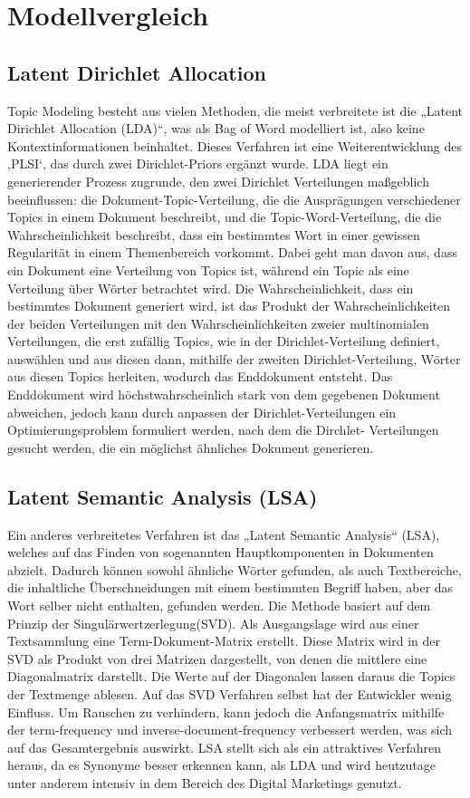 \documentclass[german,version-2020-11]{uzl-thesis}
\begin{document}
\section{Modellvergleich}
\subsection{Latent Dirichlet Allocation}
Topic Modeling besteht aus vielen Methoden, die meist verbreitete ist die „Latent Dirichlet Allocation (LDA)“, was als Bag of Word modelliert ist, also keine Kontextinformationen beinhaltet. Dieses Verfahren ist eine Weiterentwicklung des ‚PLSI‘, das durch zwei Dirichlet-Priors ergänzt wurde. LDA liegt ein generierender Prozess zugrunde, den zwei Dirichlet Verteilungen maßgeblich beeinflussen: die Dokument-Topic-Verteilung, die die Ausprägungen verschiedener Topics in einem Dokument beschreibt, und die Topic-Word-Verteilung, die die Wahrscheinlichkeit beschreibt, dass ein bestimmtes Wort in einer gewissen Regularität in einem Themenbereich vorkommt. Dabei geht man davon aus, dass ein Dokument eine Verteilung von Topics ist, während ein Topic als eine Verteilung über Wörter betrachtet wird. 
Die Wahrscheinlichkeit, dass ein bestimmtes Dokument generiert wird, ist das Produkt der Wahrscheinlichkeiten der beiden Verteilungen mit den Wahrscheinlichkeiten zweier multinomialen Verteilungen, die erst zufällig Topics, wie in der Dirichlet-Verteilung definiert, auswählen und aus diesen dann, mithilfe der zweiten Dirichlet-Verteilung, Wörter aus diesen Topics herleiten, wodurch das Enddokument entsteht. Das Enddokument wird höchstwahrscheinlich stark von dem gegebenen Dokument abweichen, jedoch kann durch anpassen der Dirichlet-Verteilungen ein Optimierungsproblem formuliert werden, nach dem die Dirchlet- Verteilungen gesucht werden, die ein möglichst ähnliches Dokument generieren.

\subsection{Latent Semantic Analysis (LSA)}
Ein anderes verbreitetes Verfahren ist das „Latent Semantic Analysis“ (LSA), welches auf das Finden von sogenannten Hauptkomponenten in Dokumenten abzielt. Dadurch können sowohl ähnliche Wörter gefunden, als auch Textbereiche, die inhaltliche Überschneidungen mit einem bestimmten Begriff haben, aber das Wort selber nicht enthalten, gefunden werden. Die Methode basiert auf dem Prinzip der Singulärwertzerlegung(SVD). Als Ausgangslage wird aus einer Textsammlung eine Term-Dokument-Matrix erstellt. Diese Matrix wird in der SVD als Produkt von drei Matrizen dargestellt, von denen die mittlere eine Diagonalmatrix darstellt. Die Werte auf der Diagonalen lassen daraus die Topics der Textmenge ablesen. Auf das SVD Verfahren selbst hat der Entwickler wenig Einfluss. Um Rauschen zu verhindern, kann jedoch die Anfangsmatrix mithilfe der term-frequency und inverse-document-frequency verbessert werden, was sich auf das Gesamtergebnis auswirkt. LSA stellt sich als ein attraktives Verfahren heraus, da es Synonyme besser erkennen kann, als LDA und wird heutzutage unter anderem intensiv in dem Bereich des Digital Marketings genutzt.
\end{document}
